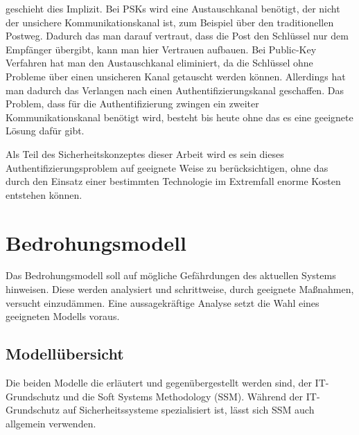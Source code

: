 \documentclass[11pt,a4paper]{report}
\begin{document}
geschieht dies Implizit. Bei PSKs wird eine Austauschkanal benötigt, der nicht der unsichere Kommunikationskanal ist, zum Beispiel über den traditionellen Postweg. Dadurch das man darauf vertraut, dass die Post den Schlüssel nur dem Empfänger übergibt, kann man hier Vertrauen aufbauen. Bei Public-Key Verfahren hat man den Austauschkanal eliminiert, da die Schlüssel ohne Probleme über einen unsicheren Kanal getauscht werden können. Allerdings hat man dadurch das Verlangen nach einen Authentifizierungskanal geschaffen. Das Problem, dass für die Authentifizierung zwingen ein zweiter Kommunikationskanal benötigt wird, besteht bis heute ohne das es eine geeignete Lösung dafür gibt. 

Als Teil des Sicherheitskonzeptes dieser Arbeit wird es sein dieses Authentifizierungsproblem auf geeignete Weise zu berücksichtigen, ohne das durch den Einsatz einer bestimmten Technologie im Extremfall enorme Kosten entstehen können. 


\chapter{Bedrohungsmodell} \label{chap:threat}

Das Bedrohungsmodell soll auf mögliche Gefährdungen des aktuellen Systems hinweisen. Diese werden analysiert und schrittweise, durch geeignete Maßnahmen, versucht einzudämmen. Eine aussagekräftige Analyse setzt die Wahl eines geeigneten Modells voraus. 

\section{Modellübersicht}

Die beiden Modelle die erläutert und gegenübergestellt werden sind, der IT-Grundschutz und die Soft Systems Methodology (SSM). Während der IT-Grundschutz auf Sicherheitssysteme spezialisiert ist, lässt sich SSM auch allgemein verwenden.
\end{document}
